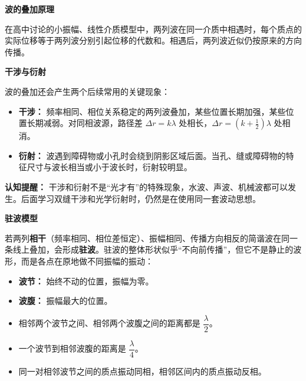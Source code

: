 \begin{competitionbox}
\textbf{波的叠加原理}

在高中讨论的小振幅、线性介质模型中，两列波在同一介质中相遇时，每个质点的实际位移等于两列波分别引起位移的代数和。相遇后，两列波近似仍按原来的方向传播。

\begin{center}


\label{fig:wave-superposition}
\end{center}

\textbf{干涉与衍射}

波的叠加还会产生两个后续常用的关键现象：
\begin{itemize}
  \item \textbf{干涉：} 频率相同、相位关系稳定的两列波叠加，某些位置长期加强，某些位置长期减弱。对同相波源，路径差 $\Delta r=k\lambda$ 处相长，$\Delta r=(k+\tfrac12)\lambda$ 处相消。
  \item \textbf{衍射：} 波遇到障碍物或小孔时会绕到阴影区域后面。当孔、缝或障碍物的特征尺寸与波长相当或小于波长时，衍射较明显。
\end{itemize}

\begin{center}


\label{fig:wave-interference-diffraction}
\end{center}

\textbf{认知提醒：} 干涉和衍射不是“光才有”的特殊现象，水波、声波、机械波都可以发生。后面学习双缝干涉和光学衍射时，仍然是在使用同一套波动思想。

\textbf{驻波模型}

若两列\textbf{相干}（频率相同、相位差恒定）、振幅相同、传播方向相反的简谐波在同一条线上叠加，会形成\textbf{驻波}。驻波的整体形状似乎“不向前传播”，但它不是静止的波形，而是各点在原地做不同振幅的振动：
\begin{itemize}
  \item \textbf{波节：} 始终不动的位置，振幅为零。
  \item \textbf{波腹：} 振幅最大的位置。
  \item 相邻两个波节之间、相邻两个波腹之间的距离都是 $\dfrac{\lambda}{2}$。
  \item 一个波节到相邻波腹的距离是 $\dfrac{\lambda}{4}$。
  \item 同一对相邻波节之间的质点振动同相，相邻区间内的质点振动反相。
\end{itemize}


\end{competitionbox}
